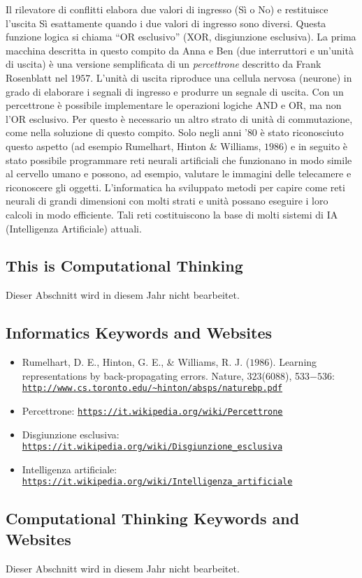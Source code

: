 \documentclass[a4paper,11pt]{report}
\newcommand{\BrochureUrlText}[1]{\texttt{#1}}
\begin{document}
Il rilevatore di conflitti elabora due valori di ingresso (Sì o No) e restituisce l’uscita Sì esattamente quando i due valori di ingresso sono diversi. Questa funzione logica si chiama \enquote{OR esclusivo} (XOR, disgiunzione esclusiva). La prima macchina descritta in questo compito da Anna e Ben (due interruttori e un’unità di uscita) è una versione semplificata di un \emph{percettrone} descritto da Frank Rosenblatt nel $1957$. L’unità di uscita riproduce una cellula nervosa (neurone) in grado di elaborare i segnali di ingresso e produrre un segnale di uscita. Con un percettrone è possibile implementare le operazioni logiche AND e OR, ma non l’OR esclusivo. Per questo è necessario un altro strato di unità di commutazione, come nella soluzione di questo compito. Solo negli anni '$80$ è stato riconosciuto questo aspetto (ad esempio Rumelhart, Hinton \& Williams, $1986$) e in seguito è stato possibile programmare reti neurali artificiali che funzionano in modo simile al cervello umano e possono, ad esempio, valutare le immagini delle telecamere e riconoscere gli oggetti.  L’informatica ha sviluppato metodi per capire come reti neurali di grandi dimensioni con molti strati e unità possano eseguire i loro calcoli in modo efficiente.  Tali reti costituiscono la base di molti sistemi di IA (Intelligenza Artificiale) attuali.


\subsection*{This is Computational Thinking}

Dieser Abschnitt wird in diesem Jahr nicht bearbeitet.


\subsection*{Informatics Keywords and Websites}

\begin{itemize}
  \item Rumelhart, D. E., Hinton, G. E., \& Williams, R. J. ($1986$). Learning representations by back-propagating errors. Nature, $323$($6088$), 533$-536$: \href{http://www.cs.toronto.edu/~hinton/absps/naturebp.pdf}{\BrochureUrlText{http://www.cs.toronto.edu/\textasciitilde{}hinton/absps/naturebp.pdf}}
  \item Percettrone: \href{https://it.wikipedia.org/wiki/Percettrone}{\BrochureUrlText{https://it.wikipedia.org/wiki/Percettrone}}
  \item Disgiunzione esclusiva: \href{https://it.wikipedia.org/wiki/Disgiunzione_esclusiva}{\BrochureUrlText{https://it.wikipedia.org/wiki/Disgiunzione\_esclusiva}}
  \item Intelligenza artificiale: \href{https://it.wikipedia.org/wiki/Intelligenza_artificiale}{\BrochureUrlText{https://it.wikipedia.org/wiki/Intelligenza\_artificiale}}
\end{itemize}


\subsection*{Computational Thinking Keywords and Websites}

Dieser Abschnitt wird in diesem Jahr nicht bearbeitet.
\end{document}
